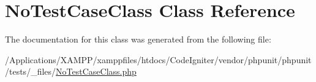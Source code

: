 \hypertarget{class_no_test_case_class}{}\section{No\+Test\+Case\+Class Class Reference}
\label{class_no_test_case_class}


The documentation for this class was generated from the following file\+:\begin{DoxyCompactItemize}
\item 
/\+Applications/\+X\+A\+M\+P\+P/xamppfiles/htdocs/\+Code\+Igniter/vendor/phpunit/phpunit/tests/\+\_\+files/\mbox{\hyperlink{_no_test_case_class_8php}{No\+Test\+Case\+Class.\+php}}\end{DoxyCompactItemize}
